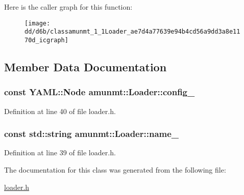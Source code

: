 Here is the caller graph for this function\+:
\nopagebreak
\begin{figure}[H]
\begin{center}
\leavevmode
\texttt{[image: dd/d6b/classamunmt\_1\_1Loader\_ae7d4a77639e94b4cd56a9dd3a8e1170d\_icgraph]}
\end{center}
\end{figure}




\subsection{Member Data Documentation}
\subsubsection[{\texorpdfstring{config\+\_\+}{config_}}]{\setlength{\rightskip}{0pt plus 5cm}const Y\+A\+M\+L\+::\+Node amunmt\+::\+Loader\+::config\+\_\+\hspace{0.3cm}{\ttfamily [protected]}}\hypertarget{classamunmt_1_1Loader_a07b77e431177705dddf379e2d99c09c6}{}\label{classamunmt_1_1Loader_a07b77e431177705dddf379e2d99c09c6}


Definition at line 40 of file loader.\+h.

\subsubsection[{\texorpdfstring{name\+\_\+}{name_}}]{\setlength{\rightskip}{0pt plus 5cm}const std\+::string amunmt\+::\+Loader\+::name\+\_\+\hspace{0.3cm}{\ttfamily [protected]}}\hypertarget{classamunmt_1_1Loader_a145c060bd39a44483a9d417808d07bd6}{}\label{classamunmt_1_1Loader_a145c060bd39a44483a9d417808d07bd6}


Definition at line 39 of file loader.\+h.



The documentation for this class was generated from the following file\+:\begin{DoxyCompactItemize}
\item 
\hyperlink{loader_8h}{loader.\+h}\end{DoxyCompactItemize}
